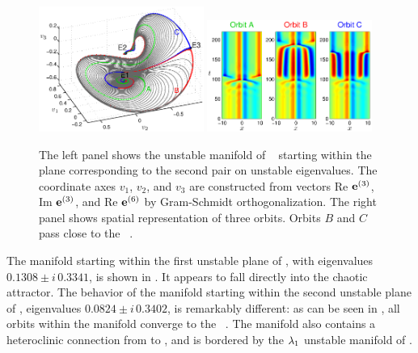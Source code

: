 \begin{figure}[t]
\begin{center}
\includegraphics[width=0.48\textwidth]{figs/ks22_E1_plane2_manifold.eps}
\includegraphics[width=0.48\textwidth]{figs/ks22_E1_plane2_orbits.eps}
\end{center}
\caption{
The left panel shows the unstable
manifold of \eqv\  starting within the plane
corresponding to the second pair on unstable eigenvalues. The
coordinate axes $v_1$, $v_2$, and $v_3$ are constructed from vectors
Re $\jEigvec{3}$, Im $\jEigvec{3}$, and Re $\jEigvec{6}$ 
by Gram-Schmidt orthogonalization.
The right panel shows spatial representation of three orbits. Orbits
$B$ and $C$ pass close to the \eqv\ .
   }
\label{f:KS22E1man2}
\end{figure}

The manifold starting within the first unstable plane of , with
eigenvalues $0.1308\pm i\, 0.3341$, is shown in
. It appears to fall directly into the
chaotic attractor.  The behavior of the manifold starting within
the second unstable plane of , eigenvalues $0.0824\pm i \, 0.3402$, is
remarkably different: as can be seen in ,
all orbits within the manifold converge to the \eqv\ .  The
manifold also contains a heteroclinic connection from  to ,
and is bordered by the $\eigExp[1]$ unstable manifold of .

